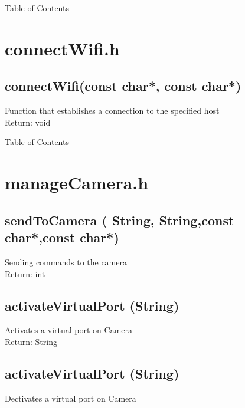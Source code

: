\documentclass[11pt, numbers=endperiod]{article}
\begin{document}
\hyperlink{toc}{Table of Contents}



\section{connectWifi.h}
\label{sec: connectWifi.h}

\subsection*{connectWifi(const char*, const char*)}
Function that establishes a connection to the specified host\\

Return: void




\hyperlink{toc}{Table of Contents}




\section*{manageCamera.h}
\label{sec: manageCamera.h}


\subsection*{sendToCamera ( String, String,const char*,const char*)}
Sending commands to the camera\\

Return: int


\subsection*{activateVirtualPort (String)}
Activates a virtual port on Camera\\

Return: String


\subsection*{activateVirtualPort (String)}
Dectivates a virtual port on Camera\\
\end{document}
